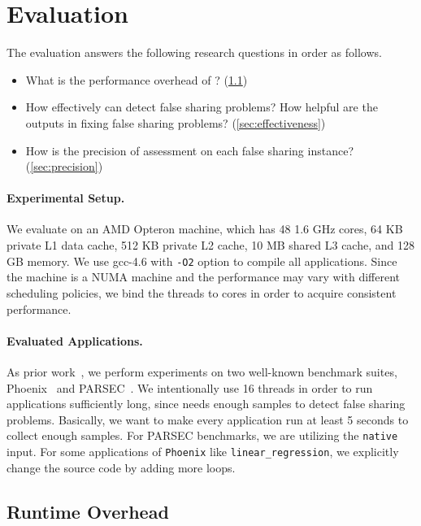 \section{Evaluation}
\label{sec:eval}

\sloppy{}
The evaluation answers the following research questions in order as follows. 

\begin{itemize}
\item What is the performance overhead of \cheetah{}? (\ref{sec:perf})

\item How effectively can \cheetah{} detect false sharing problems? How helpful are the outputs in fixing false sharing problems? (\ref{sec:effectiveness})

\item How is the precision of assessment on each false sharing instance? (\ref{sec:precision})

\end{itemize}

\paragraph{Experimental Setup.} We evaluate \cheetah{} on an AMD Opteron machine, which has 48 1.6 GHz cores, 64 KB private L1 data cache, 512 KB private L2 cache, 10 MB shared L3 cache, and 128 GB memory. We use gcc-4.6 with {\tt -O2} option to compile all applications. Since the machine is a NUMA machine and the performance may vary with different scheduling policies, we bind the threads to cores in order to acquire consistent performance.   

\paragraph{Evaluated Applications.} As prior work~\cite{Sheriff, Predator, qinzhao, mldetect}, we perform experiments on two well-known benchmark suites, Phoenix~\cite{phoenix-hpca} and PARSEC~\cite{parsec}. We intentionally use 16 threads in order to run applications sufficiently long, since \cheetah{} needs enough samples to detect false sharing problems.  Basically, we want to make every application run at least 5 seconds to collect enough samples. For PARSEC benchmarks, we are utilizing the \texttt{native} input. For some applications of \texttt{Phoenix} like \texttt{linear\_regression}, we explicitly change the source code by adding more loops. 

\subsection{Runtime Overhead}
\label{sec:perf}

